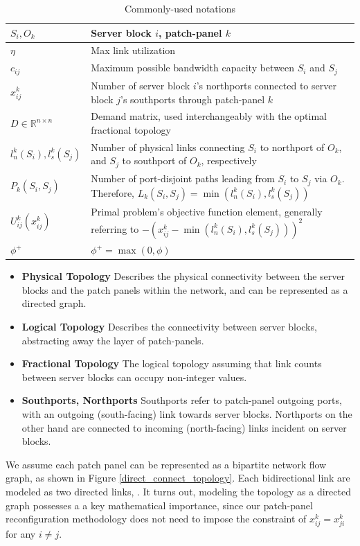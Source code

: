 \documentclass[sigconf]{acmart}
\begin{document}

\begin{table}
\begin{tabular}{|p{1.7cm}|p{6.5cm}|}
\hline
$S_i, O_k$ & Server block $i$, patch-panel $k$ \\
\hline
$\eta$ & Max link utilization \\
\hline
$c_{ij}$ & Maximum possible bandwidth capacity between $S_i$ and $S_j$\\
\hline
$x_{ij}^k$ & Number of server block $i$'s northports connected to server block $j$'s southports through patch-panel $k$ \\ 
\hline
$D \in \mathbb{R}^{n\times n}$ & Demand matrix, used interchangeably with the optimal fractional topology\\ 
\hline
$l_n^k(S_i), l_s^k(S_j)$ & Number of physical links connecting $S_i$ to northport of $O_k$, and $S_j$ to southport of $O_k$, respectively\\
\hline
$P_k(S_i, S_j)$ & Number of port-disjoint paths leading from $S_i$ to $S_j$ via $O_k$. Therefore, $L_k(S_i, S_j) = \min(l_n^k(S_i), l_s^k(S_j))$\\
\hline
$U_{ij}^k(x_{ij}^k)$ & Primal problem's objective function element, generally referring to $- (x_{ij}^k - \min(l_n^k(S_i), l_s^k(S_j)))^2$ \\
\hline
$\phi^+$ & $\phi^+ = \max(0, \phi)$ \\
\hline
\end{tabular}
\caption{Commonly-used notations} 
\label{notations}
\end{table}

\begin{itemize}
\vspace{-4pt}
    \item \textbf{Physical Topology} Describes the physical connectivity between the server blocks and the patch panels within the network, and can be represented as a directed graph.
    \item \textbf{Logical Topology} Describes the connectivity between server blocks, abstracting away the layer of patch-panels.
    \item \textbf{Fractional Topology} The logical topology assuming that link counts between server blocks can occupy non-integer values. 
    \item \textbf{Southports, Northports} Southports refer to patch-panel outgoing ports, with an outgoing (south-facing) link towards server blocks. Northports on the other hand are connected to incoming (north-facing) links incident on server blocks.
\end{itemize}
We assume each patch panel can be represented as a bipartite network flow graph, as shown in Figure \ref{direct_connect_topology}. Each bidirectional link are modeled as two directed links, . It turns out, modeling the topology as a directed graph possesses a a key mathematical importance, since our patch-panel reconfiguration methodology does not need to impose the constraint of $x_{ij}^k = x_{ji}^k$ for any $i \neq j$. 
\end{document}
